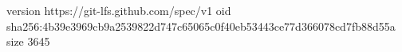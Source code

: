 version https://git-lfs.github.com/spec/v1
oid sha256:4b39e3969cb9a2539822d747c65065c0f40eb53443ce77d366078cd7fb88d55a
size 3645
